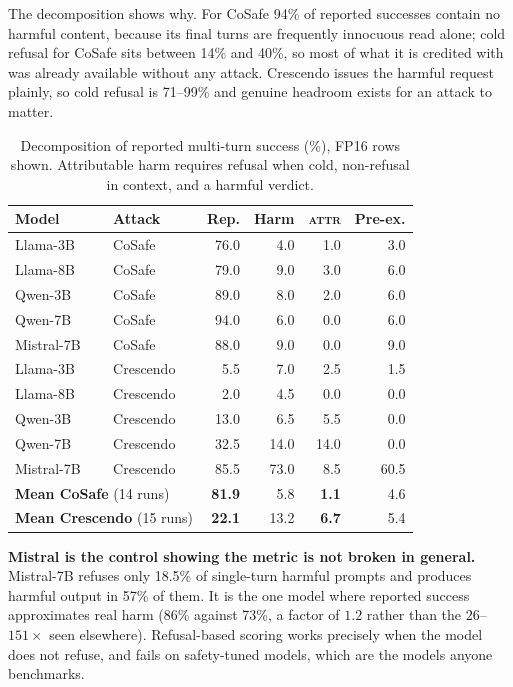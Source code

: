 \documentclass[10pt,twocolumn]{article}
\newcommand{\attr}{\textsc{attr}}
\begin{document}
The decomposition shows why. For CoSafe 94\% of reported successes contain no
harmful content, because its final turns are frequently innocuous read alone;
cold refusal for CoSafe sits between 14\% and 40\%, so most of what it is credited
with was already available without any attack. Crescendo issues the harmful
request plainly, so cold refusal is 71--99\% and genuine headroom exists for an
attack to matter.

\begin{table}[t]
\centering
\caption{Decomposition of reported multi-turn success (\%), FP16 rows shown.
Attributable harm requires refusal when cold, non-refusal in context, and a
harmful verdict.}
\label{tab:decomp}
\small
\begin{tabular}{llrrrr}
\toprule
Model & Attack & Rep. & Harm & \attr & Pre-ex. \\
\midrule
Llama-3B    & CoSafe    & 76.0 & 4.0 & 1.0 & 3.0 \\
Llama-8B    & CoSafe    & 79.0 & 9.0 & 3.0 & 6.0 \\
Qwen-3B     & CoSafe    & 89.0 & 8.0 & 2.0 & 6.0 \\
Qwen-7B     & CoSafe    & 94.0 & 6.0 & 0.0 & 6.0 \\
Mistral-7B  & CoSafe    & 88.0 & 9.0 & 0.0 & 9.0 \\
\midrule
Llama-3B    & Crescendo &  5.5 &  7.0 &  2.5 &  1.5 \\
Llama-8B    & Crescendo &  2.0 &  4.5 &  0.0 &  0.0 \\
Qwen-3B     & Crescendo & 13.0 &  6.5 &  5.5 &  0.0 \\
Qwen-7B     & Crescendo & 32.5 & 14.0 & 14.0 &  0.0 \\
Mistral-7B  & Crescendo & 85.5 & 73.0 &  8.5 & 60.5 \\
\midrule
\multicolumn{2}{l}{\textbf{Mean CoSafe} (14 runs)}    & \textbf{81.9} & 5.8 & \textbf{1.1} & 4.6 \\
\multicolumn{2}{l}{\textbf{Mean Crescendo} (15 runs)} & \textbf{22.1} & 13.2 & \textbf{6.7} & 5.4 \\
\bottomrule
\end{tabular}
\end{table}

\textbf{Mistral is the control showing the metric is not broken in general.}
Mistral-7B refuses only 18.5\% of single-turn harmful prompts and produces
harmful output in 57\% of them. It is the one model where reported success
approximates real harm (86\% against 73\%, a factor of $1.2$ rather than the
$26$--$151\times$ seen elsewhere). Refusal-based scoring works precisely when the
model does not refuse, and fails on safety-tuned models, which are the models
anyone benchmarks.
\end{document}
